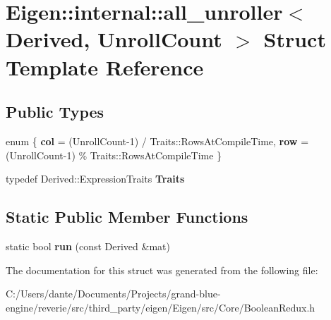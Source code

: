 \hypertarget{struct_eigen_1_1internal_1_1all__unroller}{}\section{Eigen\+::internal\+::all\+\_\+unroller$<$ Derived, Unroll\+Count $>$ Struct Template Reference}
\label{struct_eigen_1_1internal_1_1all__unroller}
\subsection*{Public Types}
\begin{DoxyCompactItemize}
\item 
\mbox{\label{struct_eigen_1_1internal_1_1all__unroller_a67f14b8b9deee1256942fe295910bf74}} 
enum \{ {\bfseries col} = (Unroll\+Count-\/1) / Traits\+::Rows\+At\+Compile\+Time, 
{\bfseries row} = (Unroll\+Count-\/1) \% Traits\+::Rows\+At\+Compile\+Time
 \}
\item 
\mbox{\label{struct_eigen_1_1internal_1_1all__unroller_a15d269678082201f46f0735e0adeff1e}} 
typedef Derived\+::\+Expression\+Traits {\bfseries Traits}
\end{DoxyCompactItemize}
\subsection*{Static Public Member Functions}
\begin{DoxyCompactItemize}
\item 
\mbox{\label{struct_eigen_1_1internal_1_1all__unroller_ae703c58c22926d7c28e1714953e5083b}} 
static bool {\bfseries run} (const Derived \&mat)
\end{DoxyCompactItemize}


The documentation for this struct was generated from the following file\+:\begin{DoxyCompactItemize}
\item 
C\+:/\+Users/dante/\+Documents/\+Projects/grand-\/blue-\/engine/reverie/src/third\+\_\+party/eigen/\+Eigen/src/\+Core/Boolean\+Redux.\+h\end{DoxyCompactItemize}
